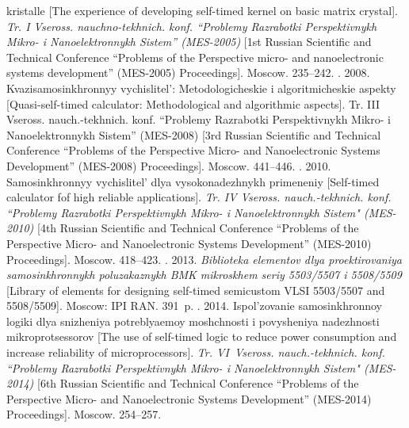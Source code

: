 \begin{multicols}{2}
{{\begin{thebibliography}{99}
kristalle [The experience of developing self-timed kernel on basic matrix crystal].
\textit{Tr. I Vseross. nauchno-tekhnich. konf.
``Problemy Razrabotki Perspektivnykh Mikro- i Nanoelektronnykh Sistem'' (MES-2005)}
[1st Russian Scientific and Technical Conference ``Problems of the Perspective
micro- and nanoelectronic systems development'' (MES-2005) Proceedings].
Moscow. 235--242.
.
2008. Kvazisamosinkhronnyy vychislitel': Metodologicheskie i
algoritmicheskie aspekty [Quasi-self-timed calculator:
Methodological and algorithmic aspects].
Tr. III Vseross. nauch.-tekhnich.
konf. ``Problemy Razrabotki Perspektivnykh Mikro- i Nanoelektronnykh Sistem''
(MES-2008)
[3rd Russian Scientific and Technical Conference ``Problems of the
Perspective Micro- and Nanoelectronic Systems Development'' (MES-2008) Proceedings].
Moscow. 441--446.
. 2010. Samosinkhronnyy
vychislitel' dlya vysokonadezhnykh primeneniy [Self-timed
calculator fof high reliable applications].
\textit{Tr. IV Vseross. nauch.-tekhnich.
konf. ``Problemy Razrabotki Perspektivnykh Mikro- i Nanoelektronnykh
Sistem" (MES-2010)}
[4th Russian Scientific and Technical Conference
``Problems of the Perspective Micro- and Nanoelectronic Systems Development''
(MES-2010) Proceedings]. Moscow. 418--423.
. 2013. \textit{Biblioteka elementov dlya proektirovaniya
samosinkhronnykh poluzakaznykh BMK mikroskhem seriy 5503/5507 i 5508/5509}
[Library of
elements for designing self-timed semicustom VLSI 5503/5507 and 5508/5509]. Moscow: IPI
RAN. 391~p.
. 2014. Ispol'zovanie
samosinkhronnoy logiki dlya snizheniya
potreblyaemoy moshchnosti i povysheniya nadezhnosti mikroprotsessorov
[The use of self-timed
logic to reduce power consumption and increase reliability of microprocessors].
\textit{Tr. VI~Vseross. nauch.-tekhnich. konf.
``Problemy Razrabotki Perspektivnykh Mikro- i
Nanoelektronnykh Sistem" (MES-2014)} [6th
Russian Scientific and Technical Conference ``Problems
of the Perspective Micro- and Nanoelectronic Systems Development'' (MES-2014)
Proceedings]. Moscow. 254--257.
\end{thebibliography}}}
\end{multicols}

